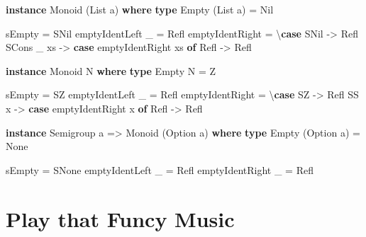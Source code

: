\documentclass[]{article}
\newenvironment{Shaded}{}{}
\newcommand{\DataTypeTok}[1]{\textcolor[rgb]{0.56,0.13,0.00}{#1}}
\newcommand{\KeywordTok}[1]{\textcolor[rgb]{0.00,0.44,0.13}{\textbf{#1}}}
\newcommand{\NormalTok}[1]{#1}
\newcommand{\OtherTok}[1]{\textcolor[rgb]{0.00,0.44,0.13}{#1}}
\begin{document}
\begin{Shaded}
\begin{Highlighting}[]
\KeywordTok{instance} \DataTypeTok{Monoid}\NormalTok{ (}\DataTypeTok{List}\NormalTok{ a) }\KeywordTok{where}
    \KeywordTok{type} \DataTypeTok{Empty}\NormalTok{ (}\DataTypeTok{List}\NormalTok{ a) }\OtherTok{=} \DataTypeTok{Nil}

\NormalTok{    sEmpty }\OtherTok{=} \DataTypeTok{SNil}
\NormalTok{    emptyIdentLeft \_ }\OtherTok{=} \DataTypeTok{Refl}
\NormalTok{    emptyIdentRight  }\OtherTok{=}\NormalTok{ \textbackslash{}}\KeywordTok{case}
      \DataTypeTok{SNil} \OtherTok{{-}\textgreater{}} \DataTypeTok{Refl}
      \DataTypeTok{SCons}\NormalTok{ \_ xs }\OtherTok{{-}\textgreater{}}
        \KeywordTok{case}\NormalTok{ emptyIdentRight xs }\KeywordTok{of}
          \DataTypeTok{Refl} \OtherTok{{-}\textgreater{}} \DataTypeTok{Refl}

\KeywordTok{instance} \DataTypeTok{Monoid} \DataTypeTok{N} \KeywordTok{where}
    \KeywordTok{type} \DataTypeTok{Empty} \DataTypeTok{N} \OtherTok{=} \DataTypeTok{Z}

\NormalTok{    sEmpty }\OtherTok{=} \DataTypeTok{SZ}
\NormalTok{    emptyIdentLeft \_ }\OtherTok{=} \DataTypeTok{Refl}
\NormalTok{    emptyIdentRight  }\OtherTok{=}\NormalTok{ \textbackslash{}}\KeywordTok{case}
      \DataTypeTok{SZ} \OtherTok{{-}\textgreater{}} \DataTypeTok{Refl}
      \DataTypeTok{SS}\NormalTok{ x }\OtherTok{{-}\textgreater{}} \KeywordTok{case}\NormalTok{ emptyIdentRight x }\KeywordTok{of}
        \DataTypeTok{Refl} \OtherTok{{-}\textgreater{}} \DataTypeTok{Refl}

\KeywordTok{instance} \DataTypeTok{Semigroup}\NormalTok{ a }\OtherTok{=\textgreater{}} \DataTypeTok{Monoid}\NormalTok{ (}\DataTypeTok{Option}\NormalTok{ a) }\KeywordTok{where}
    \KeywordTok{type} \DataTypeTok{Empty}\NormalTok{ (}\DataTypeTok{Option}\NormalTok{ a) }\OtherTok{=} \DataTypeTok{None}

\NormalTok{    sEmpty }\OtherTok{=} \DataTypeTok{SNone}
\NormalTok{    emptyIdentLeft  \_ }\OtherTok{=} \DataTypeTok{Refl}
\NormalTok{    emptyIdentRight \_ }\OtherTok{=} \DataTypeTok{Refl}
\end{Highlighting}
\end{Shaded}

\section{Play that Funcy Music}\label{play-that-funcy-music}
\end{document}
